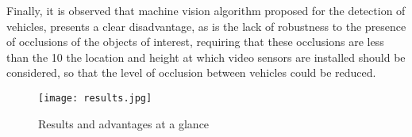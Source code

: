 \documentclass{SureshLimkar}
\begin{document}
\hspace {0.5 in}Finally, it is observed that machine vision algorithm proposed for the detection of vehicles, presents a clear disadvantage, as is the lack of robustness to the presence of occlusions
of the objects of interest, requiring that these occlusions are
less than the 10%
the location and height at which video sensors are installed
should be considered, so that the level of occlusion between
vehicles could be reduced.
\\

\begin{figure}[h]%
\centering
 \texttt{[image: results.jpg]}%
\caption{Results and advantages at a glance}%
\label{Results}%
\end{figure}
\end{document}
